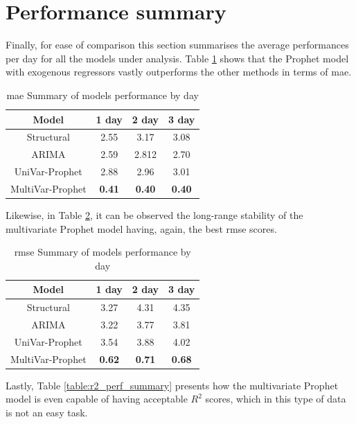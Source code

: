 \section{Performance summary}

Finally, for ease of comparison this section summarises the average performances per day for all the models under analysis. Table \ref{table:mae_perf_summary} shows that the Prophet model with exogenous regressors vastly outperforms the other methods in terms of \ac{mae}.

\begin{table}[H]
	\centering
	\begin{tabular}{|c|c|c|c|}
		\hline
		\textbf{Model} & \textbf{1 day} & \textbf{2 day}	& \textbf{3 day} \\
		\hline
		Structural		 & 		2.55 	&		3.17 		& 3.08 			\\
		\hline
		ARIMA 			 &		2.59 	& 		2.812		& 2.70 			\\
		\hline
		UniVar-Prophet 	 & 		2.88 	& 		2.96 		& 3.01 			\\
		\hline
		MultiVar-Prophet & \textbf{0.41}& \textbf{0.40}		& \textbf{0.40} \\
		\hline
	\end{tabular}
	\caption{\ac{mae} Summary of models performance by day}
	\label{table:mae_perf_summary}
\end{table}

Likewise, in Table \ref{table:rmse_perf_summary}, it can be observed the long-range stability of the multivariate Prophet model having, again, the best \ac{rmse} scores.

\begin{table}[H]
	\centering
	\begin{tabular}{|c|c|c|c|}
		\hline
		\textbf{Model} & \textbf{1 day} & \textbf{2 day}	& \textbf{3 day} \\
		\hline
		Structural		 & 		3.27 	&		4.31 		& 4.35 			\\
		\hline
		ARIMA 			 &		3.22 	& 		3.77		& 3.81 			\\
		\hline
		UniVar-Prophet 	 & 		3.54	& 		3.88		& 4.02 			\\
		\hline
		MultiVar-Prophet & \textbf{0.62}& \textbf{0.71} 	& \textbf{0.68}	\\
		\hline
	\end{tabular}
	\caption{\ac{rmse} Summary of models performance by day}
	\label{table:rmse_perf_summary}
\end{table}

Lastly, Table \ref{table:r2_perf_summary} presents how the multivariate Prophet model is even capable of having acceptable $R^2$ scores, which in this type of data is not an easy task.

